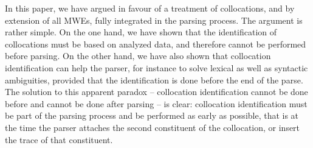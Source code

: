 \documentclass[output=paper]{langsci/langscibook}
\begin{document}
In this paper, we have argued in favour of a treatment of collocations, and by extension of all MWEs, fully integrated in the parsing process. The argument is rather simple. On the one hand, we have shown that the identification of collocations must be based on analyzed data, and therefore cannot be performed before parsing. On the other hand, we have also shown that collocation identification can help the parser, for instance to solve lexical as well as syntactic ambiguities, provided that the identification is done before the end of the parse. The solution to this apparent paradox -- collocation identification cannot be done before and cannot be done after parsing -- is clear: collocation identification must be part of the parsing process and be performed as early as possible, that is at the time the parser attaches the second constituent of the collocation, or insert the trace of that constituent. 

%
% 



\printbibliography[heading=subbibliography,notkeyword=this]

\end{document}
